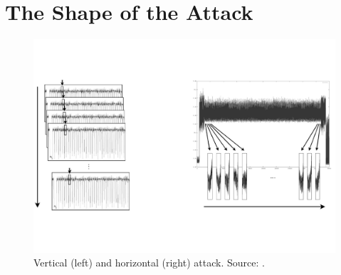 \section{The Shape of the Attack}\label{sec:form}
\begin{figure}
\centering
\includegraphics[width=\textwidth]{../Figures/horizontal_vertical.pdf} 
\caption[Vertical and horizontal attacks.]{Vertical (left) and horizontal (right) attack. Source: \cite{clavier2010horizontal}.}\label{fig:vert_hor}
\end{figure}

